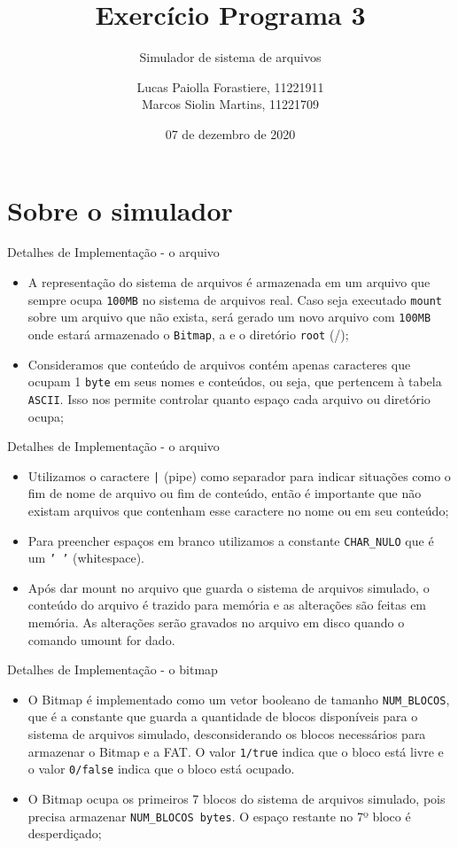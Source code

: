 \documentclass[10pt]{beamer}
\title{Exercício Programa 3}
\subtitle{Simulador de sistema de arquivos}
\institute{IME-USP}
\author{Lucas Paiolla Forastiere, 11221911\\ Marcos Siolin Martins, 11221709}
\date{07 de dezembro de 2020}
\begin{document}
    \maketitle
    \section{Sobre o simulador}
    \begin{frame}{Detalhes de Implementação - o arquivo}
        \begin{itemize}
            \justifying
            \item A representação do sistema de arquivos é armazenada em um arquivo que sempre ocupa \texttt{100MB} no sistema de arquivos real. Caso seja executado \texttt{mount} sobre um arquivo que não exista, será gerado um novo arquivo com \texttt{100MB} onde estará armazenado o \texttt{Bitmap}, a  e o diretório \texttt{root} (/);
            \item Consideramos que conteúdo de arquivos contém apenas caracteres que ocupam 1 \texttt{byte} em seus nomes e conteúdos, ou seja, que pertencem à tabela \texttt{ASCII}. Isso nos permite controlar quanto espaço cada arquivo ou diretório ocupa;
        \end{itemize}
    \end{frame}
    \begin{frame}{Detalhes de Implementação - o arquivo}
        \begin{itemize}
            \justifying
            \item Utilizamos o caractere \texttt{|} (pipe) como separador para indicar situações como o fim de nome de arquivo ou fim de conteúdo, então é importante que não existam arquivos que contenham esse caractere no nome ou em seu conteúdo;
            \item Para preencher espaços em branco utilizamos a constante \texttt{CHAR\_NULO} que é um \texttt{' '} (whitespace).
            \item Após dar mount no arquivo que guarda o sistema de arquivos simulado, o conteúdo do arquivo é trazido para memória e as alterações são feitas em memória. As alterações serão gravados no arquivo em disco quando o comando umount for dado.
        \end{itemize}
    \end{frame}
    \begin{frame}{Detalhes de Implementação - o bitmap}
        \begin{itemize}
            \justifying
            \item O Bitmap é implementado como um vetor booleano de tamanho \texttt{NUM\_BLOCOS}, que é a constante que guarda a quantidade de blocos disponíveis para o sistema de arquivos simulado, desconsiderando os blocos necessários para armazenar o Bitmap e a FAT. O valor \texttt{1/true} indica que o bloco está livre e o valor \texttt{0/false} indica que o bloco está ocupado.
            \item O Bitmap ocupa os primeiros 7 blocos do sistema de arquivos simulado, pois precisa armazenar \texttt{NUM\_BLOCOS bytes}. O espaço restante no 7º bloco é desperdiçado;
        \end{itemize}
    \end{frame}
\end{document}
